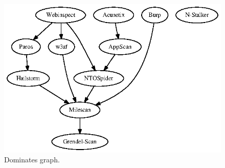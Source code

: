 \begin{figure}[tb]
      \includegraphics[scale=.80]{all_results_rank}
      \caption{Dominates graph.}
\end{figure}
